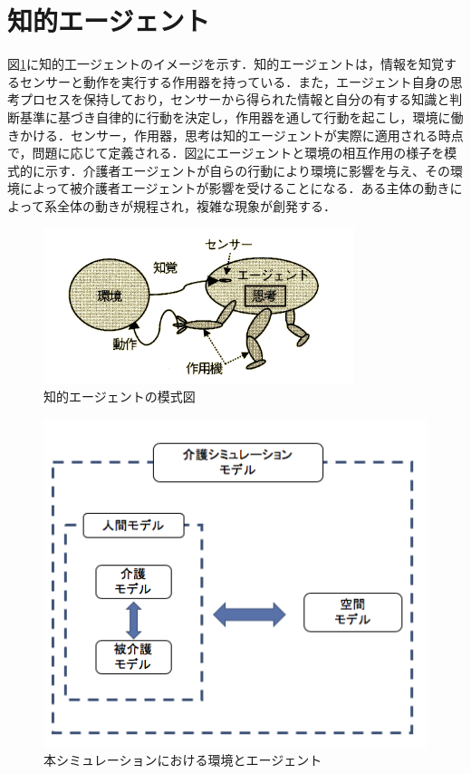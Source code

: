 \section{知的エージェント}
図\ref{intelligent_agent}に知的工一ジェントのイメージを示す．知的エージェントは，情報を知覚するセンサーと動作を実行する作用器を持っている．また，エージェント自身の思考プロセスを保持しており，センサーから得られた情報と自分の有する知識と判断基準に基づき自律的に行動を決定し，作用器を通して行動を起こし，環境に働きかける．センサー，作用器，思考は知的エージェントが実際に適用される時点で，問題に応じて定義される．図\ref{agent_modeling}にエージェントと環境の相互作用の様子を模式的に示す．介護者エージェントが自らの行動により環境に影響を与え、その環境によって被介護者エージェントが影響を受けることになる．ある主体の動きによって系全体の動きが規程され，複雑な現象が創発する．

\begin{figure}[htb]
\begin{center}
 \includegraphics[scale=0.6]{figures/intelligent_agent.png}
 \caption[知的エージェントの模式図]{知的エージェントの模式図 \label{intelligent_agent}}
\end{center}
\end{figure}

\begin{figure}[htb]
\begin{center}
 \includegraphics[scale=0.6]{figures/agent_modeling.png}
 \caption[本シミュレーションにおける環境とエージェント]{本シミュレーションにおける環境とエージェント \label{agent_modeling}}
\end{center}
\end{figure}

